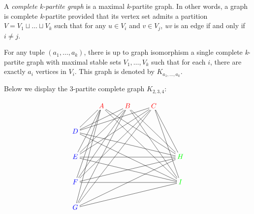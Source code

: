 \documentclass{article}
\newcommand{\fm}[1]{{\it #1}}
\begin{document}
A \emph{complete k-partite graph} is a maximal \fm{k}-partite
graph.  In other words, a graph is complete \fm{k}-partite provided
that its vertex set admits a partition $V=V_1\sqcup\dots\sqcup V_k$
such that for any $u\in V_i$ and $v\in V_j$, \fm{uv} is an edge if and
only if $i\ne j$.

For any tuple $(a_1,\dots,a_k)$, there is up to graph isomorphism a
single complete \fm{k}-partite graph with maximal stable sets
$V_1,\dots, V_k$ such that for each $i$, there are exactly $a_i$
vertices in $V_i$.  This graph is denoted by $K_{a_1,\dots,a_k}$.

Below we display the 3-partite complete graph $K_{2,3,4}$:

\[\xymatrix{
  & {\color{red}A} \ar@{-}[dl] \ar@{-}[ddl] \ar@{-}[dddl] \ar@{-}[ddddl] \ar@{-}[rrrdd] \ar@{-}[rrrddd] & {\color{red}B} \ar@{-}[dll] \ar@{-}[ddll] \ar@{-}[dddll] \ar@{-}[ddddll] \ar@{-}[rrdd] \ar@{-}[rrddd]& {\color{red}C} \ar@{-}[dlll] \ar@{-}[ddlll] \ar@{-}[dddlll] \ar@{-}[ddddlll] \ar@{-}[rdd] \ar@{-}[rddd] &   \\
{\color{blue}D} \ar@{-}[rrrrd] \ar@{-}[rrrrdd] &   &   &   &   \\
{\color{blue}E} \ar@{-}[rrrr] \ar@{-}[rrrrd] &   &   &   & {\color{green}H} \\ 
{\color{blue}F} \ar@{-}[rrrru] \ar@{-}[rrrr] &   &   &   & {\color{green}I} \\
{\color{blue}G} \ar@{-}[rrrruu] \ar@{-}[rrrru] &   &   &   &
}\]

\end{document}

